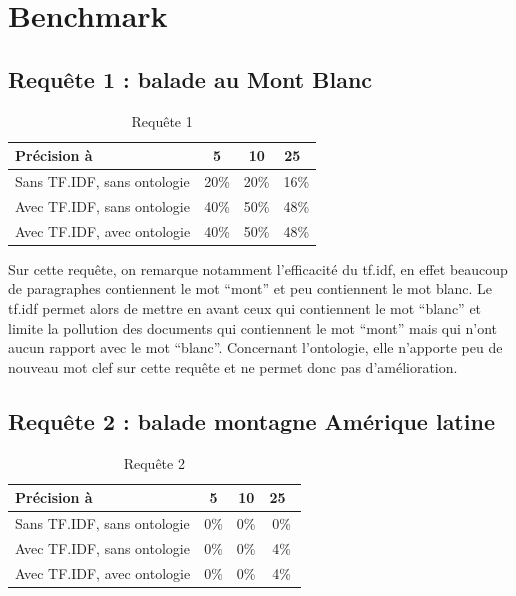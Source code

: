 \documentclass{article}
\begin{document}
\section{Benchmark}

\subsection{Requête 1 : \og balade au Mont Blanc \fg }

\begin{table}[h!!]
    \centering
    \caption{Requête 1}
\begin{tabular}{|l|c|c|c|}
    \hline
    Précision à & 5 & 10 & 25 \\
    \hline
    Sans TF.IDF, sans ontologie & 20\% & 20\% &  16\% \\
    \hline
    Avec TF.IDF, sans ontologie & 40\% & 50\% &  48\% \\
    \hline
    Avec TF.IDF, avec ontologie & 40\% & 50\% &  48\% \\
    \hline
\end{tabular}
\end{table}

Sur cette requête, on remarque notamment l'efficacité du tf.idf, en effet beaucoup de
paragraphes contiennent le mot “mont” et peu contiennent le mot blanc. Le tf.idf
permet alors de mettre en avant ceux qui contiennent le mot “blanc” et limite la
pollution des documents qui contiennent le mot “mont”  mais qui n’ont aucun rapport
avec le mot “blanc”. Concernant l’ontologie, elle n’apporte peu de nouveau mot clef
sur cette requête et ne permet donc pas d’amélioration.


\subsection{Requête 2 : \og balade montagne Amérique latine \fg }

\begin{table}[h!!]
    \centering
    \caption{Requête 2}
\begin{tabular}{|l|c|c|c|}
    \hline
    Précision à & 5 & 10 & 25 \\
    \hline
    Sans TF.IDF, sans ontologie & 0\% & 0\% &  0\% \\
    \hline
    Avec TF.IDF, sans ontologie & 0\% & 0\% &  4\% \\
    \hline
    Avec TF.IDF, avec ontologie & 0\% & 0\% &  4\% \\
    \hline
\end{tabular}
\end{table}
\end{document}
